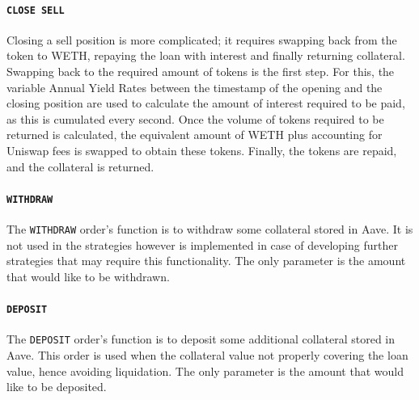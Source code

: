 \paragraph{\texttt{CLOSE\ SELL}}
Closing a sell position is more complicated; it requires swapping back from the token to WETH, repaying the loan with interest and finally returning collateral. Swapping back to the required amount of tokens is the first step. For this, the variable Annual Yield Rates between the timestamp of the opening and the closing position are used to calculate the amount of interest required to be paid, as this is cumulated every second. Once the volume of tokens required to be returned is calculated, the equivalent amount of WETH plus accounting for Uniswap fees is swapped to obtain these tokens. Finally, the tokens are repaid, and the collateral is returned.
\vspace{-3mm}
\paragraph{\texttt{WITHDRAW}}
The \texttt{WITHDRAW} order's function is to withdraw some collateral stored in Aave. It is not used in the strategies however is implemented in case of developing further strategies that may require this functionality. The only parameter is the amount that would like to be withdrawn.
\vspace{-3mm}
\paragraph{\texttt{DEPOSIT}}
The \texttt{DEPOSIT} order's function is to deposit some additional collateral stored in Aave. This order is used when the collateral value not properly covering the loan value, hence avoiding liquidation. The only parameter is the amount that would like to be deposited. 

